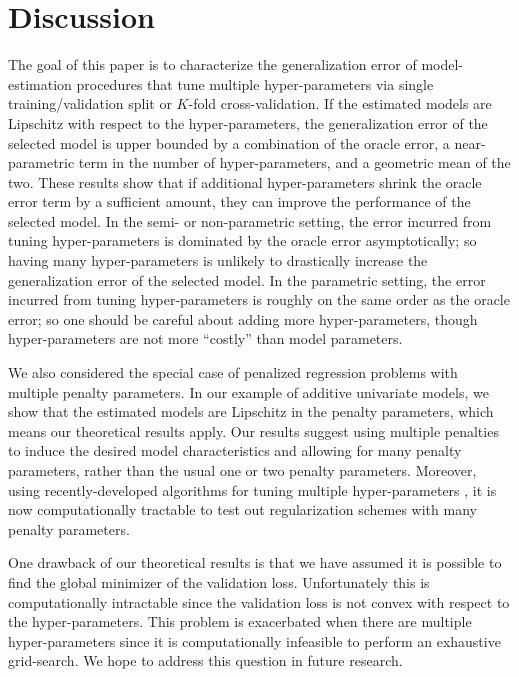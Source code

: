 \documentclass[12pt]{article}
\begin{document}
\section{Discussion}\label{sec:discussion}

The goal of this paper is to characterize the generalization error of model-estimation procedures that tune multiple hyper-parameters via single training/validation split or $K$-fold cross-validation. 
If the estimated models are Lipschitz with respect to the hyper-parameters, the generalization error of the selected model is upper bounded by a combination of the oracle error, a near-parametric term in the number of hyper-parameters, and a geometric mean of the two.
These results show that if additional hyper-parameters shrink the oracle error term by a sufficient amount, they can improve the performance of the selected model.
In the semi- or non-parametric setting, the error incurred from tuning hyper-parameters is dominated by the oracle error asymptotically; so having many hyper-parameters is unlikely to drastically increase the generalization error of the selected model.
In the parametric setting, the error incurred from tuning hyper-parameters is roughly on the same order as the oracle error; so one should be careful about adding more hyper-parameters, though hyper-parameters are not more ``costly'' than model parameters.


We also considered the special case of penalized regression problems with multiple penalty parameters. In our example of additive univariate models, we show that the estimated models are Lipschitz in the penalty parameters, which means our theoretical results apply. Our results suggest using multiple penalties to induce the desired model characteristics and allowing for many penalty parameters, rather than the usual one or two penalty parameters. Moreover, using recently-developed algorithms for tuning multiple hyper-parameters \citep{bengio2000gradient, foo2008efficient, snoek2012practical}, it is now computationally tractable to test out regularization schemes with many penalty parameters.

One drawback of our theoretical results is that we have assumed it is possible to find the global minimizer of the validation loss. Unfortunately this is computationally intractable since the validation loss is not convex with respect to the hyper-parameters. This problem is exacerbated when there are multiple hyper-parameters since it is computationally infeasible to perform an exhaustive grid-search. We hope to address this question in future research.



\end{document}
